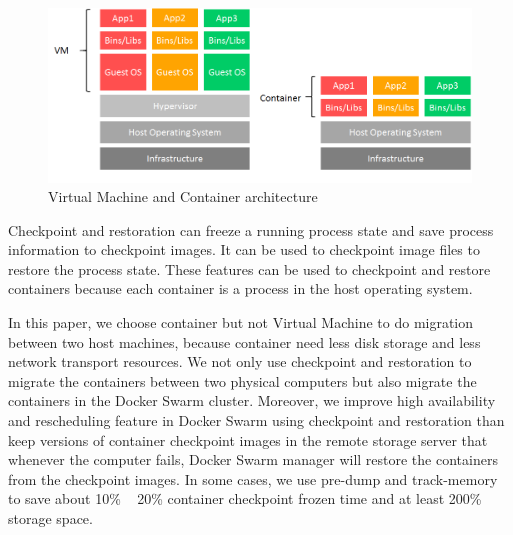 \begin{figure}[h]
\begin{center}
\includegraphics[width=15cm]{figure/VM_vs_container.png}
\end{center}
\caption{Virtual Machine and Container architecture}
\label{fig:VM_vs_container}
\end{figure}

Checkpoint and restoration \cite{Bhattiprolu:2008:VSC:1400097.1400109} can freeze a running process state and save process information to checkpoint images. It can be used to checkpoint image files to restore the process state. These features can be used to checkpoint and restore containers because each container is a process in the host operating system.

In this paper, we choose container but not Virtual Machine to do migration between two host machines, because container need less disk storage and less network transport resources. We not only use checkpoint and restoration to migrate the containers between two physical computers but also migrate the containers in the Docker Swarm cluster.
Moreover, we improve high availability and rescheduling feature in Docker Swarm using checkpoint and restoration than keep versions of container checkpoint images in the remote storage server that whenever the computer fails, Docker Swarm manager will restore the containers from the checkpoint images. In some cases, we use pre-dump and track-memory to save about 10\% ~ 20\% container checkpoint frozen time and at least 200\% storage space.
